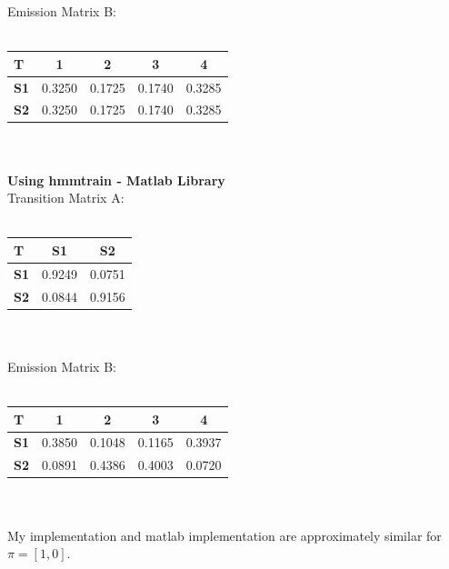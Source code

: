 \documentclass[paper=a4, fontsize=11pt]{scrartcl} %
\numberwithin{equation}{section} %
\numberwithin{figure}{section} %
\numberwithin{table}{section} %
\begin{document}
Emission Matrix B:\\\\
\begin{tabular}{l*{4}{c}}
\textbf{T} & \textbf{1} &  \textbf{2} & \textbf{3} & \textbf{4} \\
\hline
\textbf{S1} & 0.3250  &  0.1725 &   0.1740  &  0.3285\\
\textbf{S2} & 0.3250  &  0.1725  &  0.1740  &  0.3285
\end{tabular}\\\\


\textbf{Using hmmtrain - Matlab Library}\\

Transition Matrix A:\\\\
\begin{tabular}{l*{2}{c}}
\textbf{T} & \textbf{S1} &  \textbf{S2} \\
\hline
\textbf{S1} & 0.9249  &  0.0751\\
\textbf{S2} & 0.0844  &  0.9156
\end{tabular}\\\\

Emission Matrix B:\\\\
\begin{tabular}{l*{4}{c}}
\textbf{T} & \textbf{1} &  \textbf{2} & \textbf{3} & \textbf{4} \\
\hline
\textbf{S1} & 0.3850 &   0.1048  &  0.1165  &  0.3937\\
\textbf{S2} & 0.0891 &   0.4386   & 0.4003 &   0.0720
\end{tabular}\\\\

My implementation and matlab implementation are approximately similar for $\pi = [1,0]$.
\end{document}
